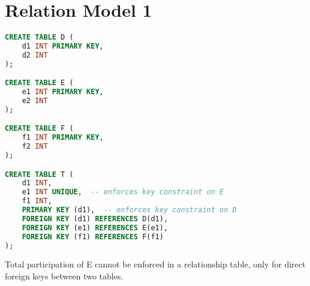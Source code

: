 \documentclass{article}
\begin{document}
\section*{Relation Model 1}

\begin{lstlisting}[language=SQL]
CREATE TABLE D (
    d1 INT PRIMARY KEY,
    d2 INT
);

CREATE TABLE E (
    e1 INT PRIMARY KEY,
    e2 INT
);

CREATE TABLE F (
    f1 INT PRIMARY KEY,
    f2 INT
);

CREATE TABLE T (
    d1 INT,
    e1 INT UNIQUE,  -- enforces key constraint on E
    f1 INT,
    PRIMARY KEY (d1),  -- enforces key constraint on D
    FOREIGN KEY (d1) REFERENCES D(d1),
    FOREIGN KEY (e1) REFERENCES E(e1),
    FOREIGN KEY (f1) REFERENCES F(f1)
);
\end{lstlisting}

Total participation of E cannot be enforced in a relationship table, only for direct foreign keys between two tables.
\end{document}
